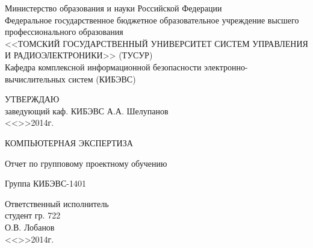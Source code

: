 \newpage
{}

\begin{center}
 Министерство образования и науки Российской Федерации\\
 Федеральное государственное бюджетное образовательное учреждение высшего профессионального образования\\
 <<ТОМСКИЙ ГОСУДАРСТВЕННЫЙ УНИВЕРСИТЕТ СИСТЕМ УПРАВЛЕНИЯ И РАДИОЭЛЕКТРОНИКИ>> (ТУСУР)\\
 Кафедра комплексной информационной безопасности электронно-вычислительных систем (КИБЭВС)\\
\end{center}

\vfill

\begin{flushright}
\begin{minipage}{0.45\textwidth}
 \begin{flushleft}
  УТВЕРЖДАЮ\\
  заведующий каф. КИБЭВС
  \underline{\hspace{3cm}}А.А. Шелупанов \\
  <<\underline{\hspace{1cm}}>>\underline{\hspace{3cm}}2014г.\\
 \end{flushleft}
\end{minipage}
\end{flushright}

\vfill

\begin{center}
КОМПЬЮТЕРНАЯ ЭКСПЕРТИЗА

Отчет по групповому проектному обучению

Группа КИБЭВС-1401
\end{center}

\vfill
\begin{flushright}
\begin{minipage}{0.45\textwidth}
 \begin{flushleft}
  Ответственный исполнитель \\
  студент гр. 722 \\
  \underline{\hspace{3cm}}О.В. Лобанов \\
  <<\underline{\hspace{1cm}}>>\underline{\hspace{3cm}}2014г.\\
 \end{flushleft}
\end{minipage}
\end{flushright}

